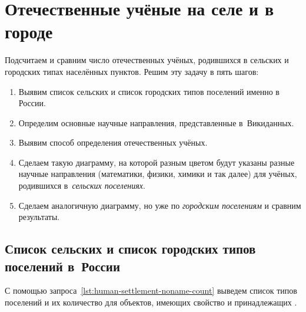 \section{Отечественные учёные на селе и в городе}

Подсчитаем и сравним число отечественных учёных, родившихся в сельских и городских типах населённых пунктов. 
Решим эту задачу в пять шагов:
\begin{enumerate}
  \item Выявим список сельских и список городских типов поселений именно в России.
  \item Определим основные научные направления, представленные в~Викиданных.
  \item Выявим способ определения отечественных учёных.
  \item Сделаем такую диаграмму, на которой разным цветом будут указаны разные научные направления (математики, физики, химики и так далее) для учёных, родившихся в~\emph{сельских поселениях}.
  \item Сделаем аналогичную диаграмму, но уже по \emph{городским поселениям} и сравним результаты.
\end{enumerate}




\newpage
\subsection{Список сельских и список городских типов поселений в~России}%
\label{sec:list-village-city-types-in-Russia}

С помощью запроса~\ref{lst:human-settlement-noname-count} 
выведем список типов поселений и их количество для объектов, 
имеющих свойство  
и принадлежащих . 

